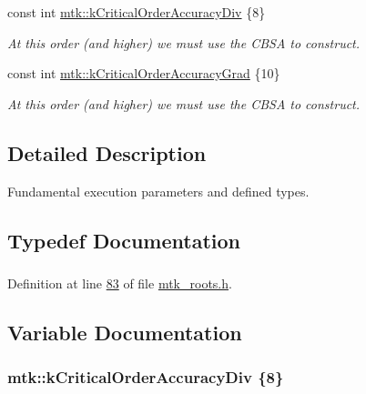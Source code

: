 \begin{DoxyCompactItemize}
const int \hyperlink{group__c01-roots_ga0898eef2108473e44a5223932d571c31}{mtk\+::k\+Critical\+Order\+Accuracy\+Div} \{8\}
\begin{DoxyCompactList}\small\item\em At this order (and higher) we must use the C\+B\+S\+A to construct. \end{DoxyCompactList}\item 
const int \hyperlink{group__c01-roots_ga295dd2f403c775ecd942c22b5a777496}{mtk\+::k\+Critical\+Order\+Accuracy\+Grad} \{10\}
\begin{DoxyCompactList}\small\item\em At this order (and higher) we must use the C\+B\+S\+A to construct. \end{DoxyCompactList}\end{DoxyCompactItemize}


\subsection{Detailed Description}
Fundamental execution parameters and defined types. 

\subsection{Typedef Documentation}
\hypertarget{group__c01-roots_gac080bbbf5cbb5502c9f00405f894857d}{
\subsubsection[{Real}]{}}\label{group__c01-roots_gac080bbbf5cbb5502c9f00405f894857d}


Definition at line \hyperlink{mtk__roots_8h_source_l00083}{83} of file \hyperlink{mtk__roots_8h_source}{mtk\+\_\+roots.\+h}.



\subsection{Variable Documentation}
\hypertarget{group__c01-roots_ga0898eef2108473e44a5223932d571c31}{
\subsubsection[{k\+Critical\+Order\+Accuracy\+Div}]{\setlength{\rightskip}{0pt plus 5cm}mtk\+::k\+Critical\+Order\+Accuracy\+Div \{8\}}}\label{group__c01-roots_ga0898eef2108473e44a5223932d571c31}


